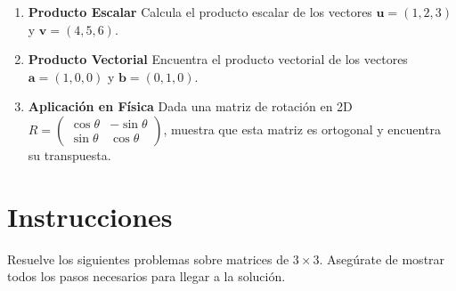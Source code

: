 \documentclass[10pt,a4paper]{article}
\begin{document}
\begin{enumerate}
\item \textbf{Producto Escalar}
Calcula el producto escalar de los vectores $\mathbf{u} = (1, 2, 3)$ y $\mathbf{v} = (4, 5, 6)$.

\item \textbf{Producto Vectorial}
Encuentra el producto vectorial de los vectores $\mathbf{a} = (1, 0, 0)$ y $\mathbf{b} = (0, 1, 0)$.

\item \textbf{Aplicación en Física}
Dada una matriz de rotación en 2D $R = \begin{pmatrix} \cos \theta & -\sin \theta \\ \sin \theta & \cos \theta \end{pmatrix}$, muestra que esta matriz es ortogonal y encuentra su transpuesta.
\end{enumerate}
\section*{Instrucciones}
Resuelve los siguientes problemas sobre matrices de $3 \times 3$. Asegúrate de mostrar todos los pasos necesarios para llegar a la solución.
\end{document}
